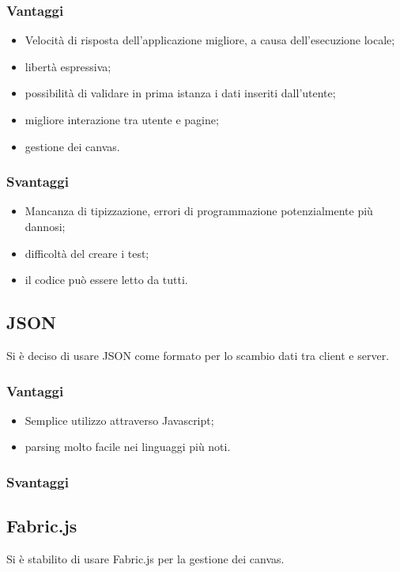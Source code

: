 \documentclass[a4paper, titlepage]{article}
\begin{document}
\subsubsection{Vantaggi}

\begin{itemize}
	\item Velocità di risposta dell'applicazione migliore, a causa dell'esecuzione locale;
	\item libertà espressiva;
	\item possibilità di validare in prima istanza i dati inseriti dall'utente;
	\item migliore interazione tra utente e pagine;
	\item gestione dei canvas.
\end{itemize}

\subsubsection{Svantaggi}

\begin{itemize}
	\item Mancanza di tipizzazione, errori di programmazione potenzialmente più dannosi;
	\item difficoltà del creare i test;
	\item il codice può essere letto da tutti.
\end{itemize}

\subsection{JSON}
Si è deciso di usare JSON come formato per lo scambio dati tra client e server.

\subsubsection{Vantaggi}

\begin{itemize}
	\item Semplice utilizzo attraverso Javascript;
	\item parsing molto facile nei linguaggi più noti.
\end{itemize}

\subsubsection{Svantaggi}

\subsection{Fabric.js}
Si è stabilito di usare Fabric.js per la gestione dei canvas.
\end{document}
